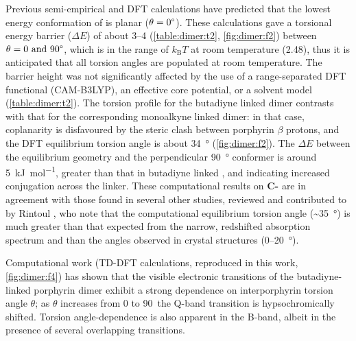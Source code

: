 	Previous semi-empirical and DFT calculations have predicted that the lowest energy conformation of  is planar ($\theta = 0\degree$). These calculations gave a torsional energy barrier ($\Delta E$) of about \SIrange{3}{4}{\kjmol} (\autoref{table:dimer:t2}, \autoref{fig:dimer:f2}) between $\theta = 0\text{ and }90\degree$,\autocite{Lin1995,Stranger1996,Winters2007} which is in the range of $k_\text{B}T$ at room temperature (\SI{2.48}{\kjmol}), thus it is anticipated that all torsion angles are populated at room temperature. The barrier height was not significantly affected by the use of a range-separated DFT functional (CAM-B3LYP),\autocite{Yanai2004} an effective core potential, or a solvent model (\autoref{table:dimer:t2}). The torsion profile for the butadiyne linked dimer  contrasts with that for the corresponding monoalkyne linked dimer\autocite{Lin1994}: in that case, coplanarity is disfavoured by the steric clash between porphyrin $\beta$ protons, and the DFT equilibrium torsion angle is about \SI{34}{\degree} (\autoref{fig:dimer:f2}). The $\Delta E$ between the equilibrium geometry and the perpendicular \SI{90}{\degree} conformer is around \SI{5}{\kilo\joule\per\mole}, greater than that in butadiyne linked , and indicating increased conjugation across the linker. These computational results on \textbf{C-} are in agreement with those found in several other studies, reviewed and contributed to by Rintoul ,\autocite{Rintoul2013} who note that the computational equilibrium torsion angle (\textasciitilde{}\SI{35}{\degree}) is much greater than that expected from the narrow, redshifted absorption spectrum and than the angles observed in crystal structures (0--\SI{20}{\degree}).


	Computational work\autocite{Winters2007} (TD-DFT calculations, reproduced in this work, \autoref{fig:dimer:f4}) has shown that the visible electronic transitions of the butadiyne-linked porphyrin dimer exhibit a strong dependence on interporphyrin torsion angle $\theta$; as $\theta$ increases from 0 to 90\textdegree\ the Q-band transition is hypsochromically shifted. Torsion angle-dependence is also apparent in the B-band, albeit in the presence of several overlapping transitions.


